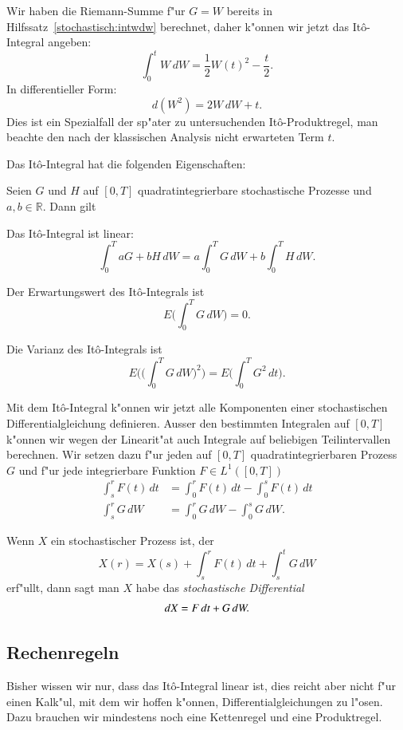 \begin{beispiel}
Wir haben die Riemann-Summe f"ur $G=W$ bereits in
Hilfssatz~\ref{stochastisch:intwdw} berechnet, daher k"onnen wir jetzt
das It\^o-Integral angeben:
\[
\int_0^t W\,dW
=
\frac12 W(t)^2 -\frac{t}2.
\]
In differentieller Form:
\[
d(W^2)
=
2W\,dW + t.
\]
Dies ist ein Spezialfall der sp"ater zu untersuchenden It\^o-Produktregel,
man beachte den nach der klassischen Analysis nicht erwarteten Term $t$.
\end{beispiel}

Das It\^o-Integral hat die folgenden Eigenschaften:

\begin{satz}
\label{satz:ito-integral}
Seien $G$ und $H$ auf $[0,T]$ quadratintegrierbare stochastische Prozesse
und $a,b\in\mathbb R$. Dann gilt
\begin{compactenum}
\item Das It\^o-Integral ist linear:
\[
\int_0^T aG+bH\,dW
=
a\int_0^TG\,dW
+
b\int_0^TH\,dW.
\]
\item Der Erwartungswert des It\^o-Integrals ist
\[
E\biggl(\int_0^T G\,dW\biggr)=0.
\]
\item Die Varianz des It\^o-Integrals ist
\[
E\biggl(\biggl(\int_0^TG\,dW\biggr)^2\biggr)
=
E\biggl(\int_0^T G^2\,dt\biggr).
\]
\end{compactenum}
\end{satz}

Mit dem It\^o-Integral k"onnen wir jetzt alle Komponenten einer
stochastischen Differentialgleichung definieren.
Ausser den bestimmten Integralen auf $[0,T]$ k"onnen wir wegen der
Linearit"at auch Integrale auf beliebigen Teilintervallen berechnen.
Wir setzen dazu f"ur jeden auf $[0,T]$ quadratintegrierbaren Prozess $G$ 
und f"ur jede integrierbare Funktion $F\in L^1([0,T])$ 
\begin{align*}
\int_s^r F(t)\,dt&=\int_0^r F(t)\,dt - \int_0^s F(t)\,dt
\\
\int_s^r G\,dW&=\int_0^r G\,dW - \int_0^s G\,dW.
\end{align*}
\begin{definition}
Wenn $X$ ein stochastischer Prozess ist, der
\[
X(r)=X(s)+\int_s^rF(t)\,dt + \int_s^tG\,dW
\]
erf"ullt, dann sagt man $X$ habe das {\em stochastische Differential}
\[
dX=F\,dt + G\,dW.
\index{stochastisches Differential}%
\index{Differential, stochastisches}%
\]
\end{definition}

%
%
%
\subsection{Rechenregeln}
Bisher wissen wir nur, dass das It\^o-Integral linear ist, dies reicht
aber nicht f"ur einen Kalk"ul, mit dem wir hoffen k"onnen,
Differentialgleichungen zu l"osen.
Dazu brauchen wir mindestens noch eine Kettenregel und eine
Produktregel.


